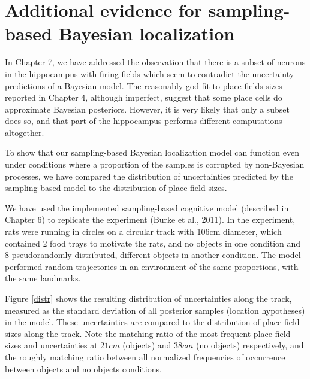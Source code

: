 
\chapter{Additional evidence for sampling-based Bayesian localization}
\label{apx:pfev}

In Chapter 7, we have addressed the observation that there is a subset of neurons in the hippocampus with firing fields which seem to contradict the uncertainty predictions of a Bayesian model. The reasonably god fit to place fields sizes reported in Chapter 4, although imperfect, suggest that some place cells do approximate Bayesian posteriors. However, it is very likely that only a subset does so, and that part of the hippocampus performs different computations altogether.

To show that our sampling-based Bayesian localization model can function even under conditions where a proportion of the samples is corrupted by non-Bayesian processes, we have compared the distribution of uncertainties predicted by the sampling-based model to the distribution of place field sizes.

We have used the implemented sampling-based cognitive model (described in Chapter 6) to replicate the experiment (Burke et al., 2011). In the experiment, rats were running in circles on a circular track with 106cm diameter, which contained 2 food trays to motivate the rats, and no objects in one condition and 8 pseudorandomly distributed, different objects in another condition. The model performed random trajectories in an environment of the same proportions, with the same landmarks. 

Figure \ref{distr} shows the resulting distribution of uncertainties along the track, measured as the standard deviation of all posterior samples (location hypotheses) in the model. These uncertainties are compared to the distribution of place field sizes along the track. Note the matching ratio of the most frequent place field sizes and uncertainties at $21cm$ (objects) and $38cm$ (no objects) respectively, and the roughly matching ratio between all normalized frequencies of occurrence between objects and no objects conditions.

